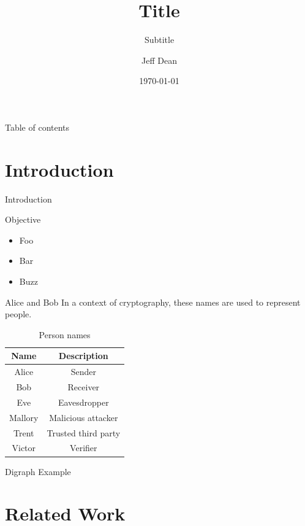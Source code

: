 \documentclass[15pt,aspectratio=169]{beamer}
\title{Title}
\subtitle{Subtitle}
\date{\today}
\author{Jeff Dean}
\institute{B4, Snivy Lab.}
\begin{document}
\maketitle

\begin{frame}{Table of contents}
    \tableofcontents[hideallsubsections]
\end{frame}

\section{Introduction}

\begin{frame}{Introduction}

Objective

\begin{itemize}
    \item Foo
    \item Bar
    \item Buzz
\end{itemize}
    
\end{frame}

\begin{frame}{Alice and Bob}
    In a context of cryptography, these names are used to represent people.
    
    \begin{table}[]
        \centering
        \caption{Person names}
        \begin{tabular}{c|c}
             Name & Description \\ \hline
             Alice & Sender \\
             Bob & Receiver  \\
             Eve & Eavesdropper \\
             Mallory & Malicious attacker \\
             Trent & Trusted third party \\
             Victor & Verifier
        \end{tabular}
        \label{tab:my_label}
    \end{table}
\end{frame}

\begin{frame}{Digraph Example}
\end{frame}

\section{Related Work}
\end{document}
